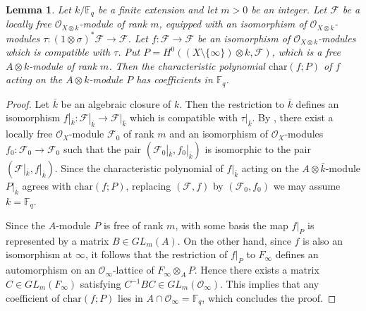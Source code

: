 \documentclass[10pt]{amsart}
\theoremstyle{plain}
\newtheorem{lem}[thm]{Lemma}
\theoremstyle{definition}
\newcommand{\chr}{\mathrm{char}}
\newcommand{\cF}{\mathcal{F}}
\newcommand{\cO}{\mathcal{O}}
\newcommand{\bF}{\mathbb{F}}
\begin{document}
\begin{lem}\label{LemInftyCharPoly}
	Let $k/\bF_q$ be a finite extension and let $m>0$ be an integer. 
	Let $\cF$ be a locally free $\cO_{X\otimes k}$-module of rank $m$, equipped with an isomorphism of 
	$\cO_{X\otimes k}$-modules $\tau:(1\otimes\sigma)^*\cF\to \cF$.
	Let $f:\cF\to \cF$ be an isomorphism of $\cO_{X\otimes k}$-modules which is compatible with $\tau$.
	Put $P=H^0((X\setminus\{\infty\})\otimes k,\cF)$, which is a free $A\otimes k$-module of rank $m$.
	Then the characteristic polynomial $\chr(f;P)$ of $f$ acting on the $A\otimes k$-module $P$ has coefficients in $\bF_q$.
\end{lem}
\begin{proof}
	Let $\bar{k}$ be an algebraic closure of $k$. 
	Then the restriction to $\bar{k}$ defines an isomorphism $f|_{\bar{k}}:\cF|_{\bar{k}}\to \cF|_{\bar{k}}$
	which is compatible with $\tau|_{\bar{k}}$.
	By \cite[Proposition 1.1]{Dri_F}, there exist a locally free
	$\cO_X$-module $\cF_0$ of rank $m$ and an isomorphism of $\cO_X$-modules $f_0:\cF_0\to \cF_0$
	such that the pair $(\cF_0|_{\bar{k}},f_0|_{\bar{k}})$ is isomorphic to the pair $(\cF|_{\bar{k}},f|_{\bar{k}})$. Since the characteristic polynomial of $f|
	_{\bar{k}}$ acting on the $A\otimes \bar{k}$-module 
	$P|_{\bar{k}}$
	agrees with $\chr(f;P)$,
	replacing $(\cF,f)$ by $(\cF_0,f_0)$ we may assume $k=\bF_q$.
	
	Since the $A$-module $P$ is free of rank $m$, with some basis the map $f|_P$ is represented by a matrix $B\in \mathit{GL}_{m}(A)$.
On the other hand, since $f$ is also an isomorphism at $\infty$, 
it follows that the restriction of $f|_P$ to $F_\infty$
defines an automorphism on an $\cO_\infty$-lattice of $F_\infty\otimes_A P$. Hence there exists a matrix $C\in \mathit{GL}_m(F_\infty)$ satisfying
$C^{-1}B C\in \mathit{GL}_m(\cO_\infty)$. This implies that any coefficient of $\chr(f;P)$ lies in $A\cap \cO_\infty=\bF_q$,
which concludes the proof.
\end{proof}
\end{document}
